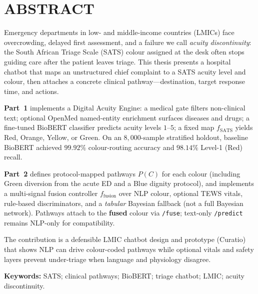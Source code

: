 \chapter*{ABSTRACT}

Emergency departments in low- and middle-income countries (LMICs) face overcrowding, delayed first assessment, and a failure we call \emph{acuity discontinuity}: the South African Triage Scale (SATS) colour assigned at the desk often stops guiding care after the patient leaves triage. This thesis presents a hospital chatbot that maps an unstructured chief complaint to a SATS acuity level and colour, then attaches a concrete clinical pathway---destination, target response time, and actions.

\textbf{Part~1} implements a Digital Acuity Engine: a medical gate filters non-clinical text; optional OpenMed named-entity enrichment surfaces diseases and drugs; a fine-tuned BioBERT classifier predicts acuity levels \(1\)--\(5\); a fixed map \(f_{\mathrm{SATS}}\) yields Red, Orange, Yellow, or Green. On an \(8{,}000\)-sample stratified holdout, baseline BioBERT achieved \(99.92\%\) colour-routing accuracy and \(98.14\%\) Level-1 (Red) recall.

\textbf{Part~2} defines protocol-mapped pathways \(P(C)\) for each colour (including Green diversion from the acute ED and a Blue dignity protocol), and implements a multi-signal fusion controller \(f_{\mathrm{fusion}}\) over NLP colour, optional TEWS vitals, rule-based discriminators, and a \emph{tabular} Bayesian fallback (not a full Bayesian network). Pathways attach to the \textbf{fused} colour via \texttt{/fuse}; text-only \texttt{/predict} remains NLP-only for compatibility.

The contribution is a defensible LMIC chatbot design and prototype (Curatio) that shows NLP can drive colour-coded pathways while optional vitals and safety layers prevent under-triage when language and physiology disagree.

\vspace{0.5cm}
\noindent\textbf{Keywords:} SATS; clinical pathways; BioBERT; triage chatbot; LMIC; acuity discontinuity.
